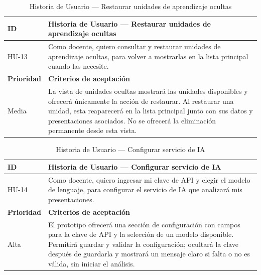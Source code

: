 \documentclass[11pt]{article}
\newcommand{\ttstyle}{%
  \small
  \setlength{\tabcolsep}{6pt}%
  \renewcommand{\arraystretch}{1.25}%
  \arrayrulecolor{azulprofundo}%
}
\newcommand{\hairrule}{%
  \arrayrulecolor{azulregla}\midrule[0.3pt]\arrayrulecolor{azulprofundo}%
}
\begin{document}
\begin{table}[H]
    \centering
    \renewcommand{\arraystretch}{1.2}
    \ttstyle
    \begin{tabular}{p{2.5cm}p{11cm}}
        \toprule
        \textbf{ID} & \textbf{Historia de Usuario --- Restaurar unidades de aprendizaje ocultas} \\
        \midrule
        HU-13 & Como docente, quiero consultar y restaurar unidades de aprendizaje ocultas, para volver a mostrarlas en la lista principal cuando las necesite. \\
        \hairrule
        \textbf{Prioridad} & \textbf{Criterios de aceptación} \\
        \hairrule
        Media & La vista de unidades ocultas mostrará las unidades disponibles y ofrecerá únicamente la acción de restaurar. Al restaurar una unidad, esta reaparecerá en la lista principal junto con sus datos y presentaciones asociados. No se ofrecerá la eliminación permanente desde esta vista. \\
        \bottomrule
    \end{tabular}
    \caption{Historia de Usuario --- Restaurar unidades de aprendizaje ocultas}
    \label{tab:hu-restaurar-unidades-ocultas}
\end{table}

\begin{table}[H]
    \centering
    \renewcommand{\arraystretch}{1.2}
    \ttstyle
    \begin{tabular}{p{2.5cm}p{11cm}}
        \toprule
        \textbf{ID} & \textbf{Historia de Usuario --- Configurar servicio de IA} \\
        \midrule
        HU-14 & Como docente, quiero ingresar mi clave de API y elegir el modelo de lenguaje, para configurar el servicio de IA que analizará mis presentaciones. \\
        \hairrule
        \textbf{Prioridad} & \textbf{Criterios de aceptación} \\
        \hairrule
        Alta & El prototipo ofrecerá una sección de configuración con campos para la clave de API y la selección de un modelo disponible. Permitirá guardar y validar la configuración; ocultará la clave después de guardarla y mostrará un mensaje claro si falta o no es válida, sin iniciar el análisis. \\
        \bottomrule
    \end{tabular}
    \caption{Historia de Usuario --- Configurar servicio de IA}
    \label{tab:hu-configurar-servicio-ia}
\end{table}
\end{document}
